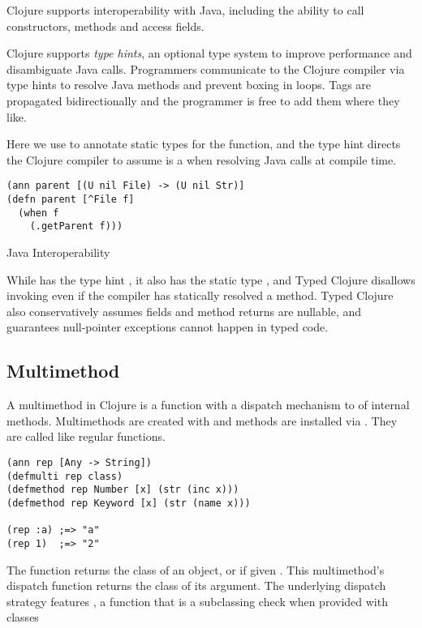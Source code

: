 Clojure supports interoperability with Java, including the ability to
call constructors, methods and access fields.

Clojure supports \emph{type hints}, an optional type system to improve performance
and disambiguate Java calls.
Programmers communicate to the Clojure compiler via type hints
to resolve Java methods and prevent boxing in loops. Tags are propagated bidirectionally
and the programmer is free to add them where they like.

Here we use  to annotate static types for the function, and the type hint
 directs the Clojure compiler to assume  is a 
when resolving Java calls at compile time.

\begin{listing}
  \begin{verbatim}
(ann parent [(U nil File) -> (U nil Str)]
(defn parent [^File f]
  (when f
    (.getParent f)))
  \end{verbatim}
\caption{Java Interoperability}
\end{listing}

While  has the type hint , it also has the static type ,
and Typed Clojure disallows invoking  even if the compiler
has statically resolved a method.
Typed Clojure also conservatively assumes fields and method returns are nullable,
and guarantees null-pointer exceptions cannot happen in typed code.

\subsection{Multimethod}

A multimethod in Clojure is a function with a dispatch mechanism to
of internal methods. Multimethods are created with {}
and methods are installed via {}.
They are called like regular functions.

\begin{verbatim}
(ann rep [Any -> String])
(defmulti rep class)
(defmethod rep Number [x] (str (inc x)))
(defmethod rep Keyword [x] (str (name x)))

(rep :a) ;=> "a"
(rep 1)  ;=> "2"
\end{verbatim}

The  function returns the class of an object, or 
if given . This multimethod's dispatch function returns the class of its
argument. The underlying dispatch strategy features , a function
that is a subclassing check when provided with classes

